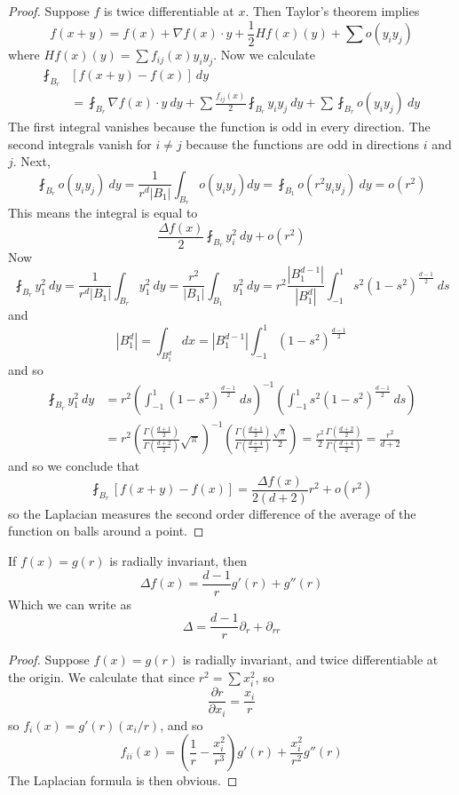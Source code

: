\begin{proof}
    Suppose $f$ is twice differentiable at $x$. Then Taylor's theorem implies
    \[ f(x + y) = f(x) + \nabla f(x) \cdot y + \frac{1}{2} Hf(x)(y) + \sum o(y_iy_j) \]
    where $Hf(x)(y) = \sum f_{ij}(x) y_iy_j$. Now we calculate
    \begin{align*}
        \fint_{B_r} &[f(x + y) - f(x)]\ dy\\
        &= \fint_{B_r} \nabla f(x) \cdot y\ dy + \sum \frac{f_{ij}(x)}{2} \fint_{B_r} y_iy_j\ dy + \sum \fint_{B_r} o(y_iy_j)\ dy
    \end{align*}
    The first integral vanishes because the function is odd in every direction. The second integrals vanish for $i \neq j$ because the functions are odd in directions $i$ and $j$. Next,
    \[ \fint_{B_r} o(y_iy_j)\ dy = \frac{1}{r^d |B_1|} \int_{B_r} o(y_iy_j) dy = \fint_{B_1} o(r^2 y_iy_j)\ dy = o(r^2) \]
    This means the integral is equal to
    \[ \frac{\Delta f(x)}{2} \fint_{B_r} y_i^2\ dy + o(r^2) \]
    Now
    \[ \fint_{B_r} y_1^2\ dy = \frac{1}{r^d |B_1|} \int_{B_r} y_1^2\ dy = \frac{r^2}{|B_1|} \int_{B_1} y_1^2\ dy = r^2 \frac{|B_1^{d-1}|}{|B_1^d|} \int_{-1}^1 s^2 (1 - s^2)^{\frac{d-1}{2}}\ ds \]
    and
    \[ |B_1^d| = \int_{B_1^d} dx = |B_1^{d-1}| \int_{-1}^1 (1 - s^2)^{\frac{d-1}{2}} \]
    and so
    \begin{align*}
        \fint_{B_r} y_1^2\ dy &= r^2 \left( \int_{-1}^1 (1 - s^2)^{\frac{d-1}{2}}\ ds \right)^{-1} \left( \int_{-1}^1 s^2 (1 - s^2)^{\frac{d-1}{2}}\ ds \right)\\
        &= r^2 \left( \frac{\Gamma( \frac{d+1}{2} )}{\Gamma ( \frac{d + 2}{2} )} \sqrt{\pi} \right)^{-1} \left( \frac{\Gamma( \frac{d+1}{2} )}{\Gamma( \frac{d + 4}{2} )} \frac{\sqrt{\pi}}{2} \right) = \frac{r^2}{2} \frac{\Gamma( \frac{d+2}{2})}{\Gamma( \frac{d+4}{2} )} = \frac{r^2}{d + 2}
    \end{align*}
    and so we conclude that
    \[ \fint_{B_r} [f(x+y) - f(x)] = \frac{\Delta f(x)}{2(d+2)} r^2 + o(r^2) \]
    so the Laplacian measures the second order difference of the average of the function on balls around a point.
\end{proof}

\begin{theorem}
    If $f(x) = g(r)$ is radially invariant, then
    \[ \Delta f(x) = \frac{d - 1}{r} g'(r) + g''(r) \]
    Which we can write as
    \[ \Delta = \frac{d-1}{r} \partial_r + \partial_{rr} \]
\end{theorem}
\begin{proof}
Suppose $f(x) = g(r)$ is radially invariant, and twice differentiable at the origin. We calculate that since $r^2 = \sum x_i^2$, so
%
\[ \frac{\partial r}{\partial x_i} = \frac{x_i}{r} \]
%
so $f_i(x) = g'(r) (x_i/r)$, and so
%
\[ f_{ii}(x) = \left( \frac{1}{r} - \frac{x_i^2}{r^3} \right) g'(r) + \frac{x_i^2}{r^2} g''(r) \]
%
The Laplacian formula is then obvious.
\end{proof}

